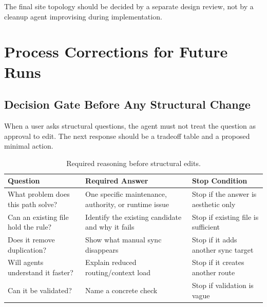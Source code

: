 \documentclass[a4paper,11pt,openany]{report}
\begin{document}
The final site topology should be decided by a separate design review, not by a
cleanup agent improvising during implementation.


\chapter{Process Corrections for Future Runs}
\label{ch:process}


\section{Decision Gate Before Any Structural Change}

When a user asks structural questions, the agent must not treat the question as
approval to edit. The next response should be a tradeoff table and a proposed
minimal action.

\begin{table}[htbp]
\centering
\caption{Required reasoning before structural edits.}
\label{tab:structure-gate}
\small
\begin{tabularx}{\textwidth}{l X X}
\toprule
\textbf{Question} & \textbf{Required Answer} & \textbf{Stop Condition} \\
\midrule
What problem does this path solve? & One specific maintenance, authority, or runtime issue & Stop if the answer is aesthetic only \\
Can an existing file hold the rule? & Identify the existing candidate and why it fails & Stop if existing file is sufficient \\
Does it remove duplication? & Show what manual sync disappears & Stop if it adds another sync target \\
Will agents understand it faster? & Explain reduced routing/context load & Stop if it creates another route \\
Can it be validated? & Name a concrete check & Stop if validation is vague \\
\bottomrule
\end{tabularx}
\end{table}
\end{document}
